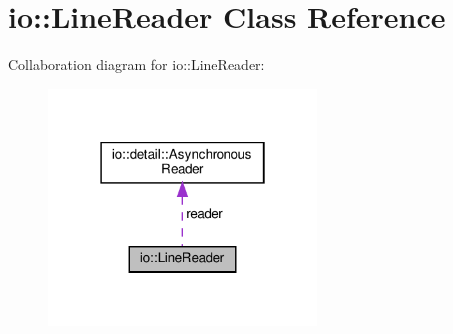 \hypertarget{classio_1_1LineReader}{}\section{io\+:\+:Line\+Reader Class Reference}
\label{classio_1_1LineReader}


Collaboration diagram for io\+:\+:Line\+Reader\+:\nopagebreak
\begin{figure}[H]
\begin{center}
\leavevmode
\includegraphics[width=202pt]{classio_1_1LineReader__coll__graph}
\end{center}
\end{figure}
